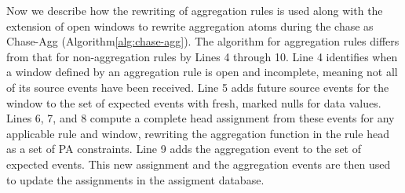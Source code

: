 Now we describe how the rewriting of aggregation rules
is used along with the extension of open windows
to rewrite aggregation atoms
during the chase as {\sf Chase-Agg}
(Algorithm\:\ref{alg:chase-agg}).
The algorithm for aggregation rules differs from that
for non-aggregation rules
by Lines 4 through 10.
Line 4 identifies when a window defined by an aggregation rule is open and incomplete,
meaning not all of its source events have been received.
Line 5 adds future source events for the window
to the set of expected events
with fresh, marked nulls for data values.
Lines 6, 7, and 8 compute a complete head assignment from these events
for any applicable rule and window,
rewriting the aggregation function in the rule head as a set of PA constraints.
Line 9 adds the aggregation event to the set of expected events.
This new assignment and the aggregation events are then used to update the assignments
in the assigment database.


